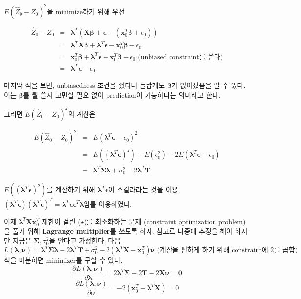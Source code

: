 \documentclass[b5paper,]{scrbook}
\theoremstyle{plain}
\theoremstyle{definition}
\numberwithin{equation}{section}
\begin{document}
\(E(\hat{Z}_{0}-Z_{0})^{2}\)을 minimize하기 위해 우선

\begin{eqnarray*}
\hat{Z}_{0}-Z_{0} &=& \boldsymbol{\lambda}^{T}(\mathbf{X}\boldsymbol{\beta}+\boldsymbol{\epsilon}-(\mathbf{x}_{0}^{T}\boldsymbol{\beta}+\epsilon_{0}))\\
&=&\boldsymbol{\lambda}^{T}\mathbf{X}\boldsymbol{\beta}+\boldsymbol{\lambda}^{T}\boldsymbol{\epsilon}-\mathbf{x}_{0}^{T}\boldsymbol{\beta}-\epsilon_{0}\\
&=&\mathbf{x}_{0}^{T}\boldsymbol{\beta}+\boldsymbol{\lambda}^{T}\boldsymbol{\epsilon}-\mathbf{x}_{0}^{T}\boldsymbol{\beta}-\epsilon_{0}\text{ (unbiased constraint를 쓴다)}\\
&=&\boldsymbol{\lambda}^{T}\boldsymbol{\epsilon}-\epsilon_{0}
\end{eqnarray*}

마지막 식을 보면, unbiasedness 조건을 줬더니 놀랍게도 \(\boldsymbol{\beta}\)가 없어졌음을 알 수 있다. 이는 \(\boldsymbol{\beta}\)를 뭘 쓸지 고민할 필요 없이 prediction이 가능하다는 의미라고 한다.

그러면 \(E(\hat{Z}_{0}-Z_{0})^{2}\)의 계산은

\begin{eqnarray*}
E(\hat{Z}_{0}-Z_{0})^{2}&=&E(\boldsymbol{\lambda}^{T}\boldsymbol{\epsilon}-\epsilon_{0})^{2}\\
&=&E((\boldsymbol{\lambda}^{T}\boldsymbol{\epsilon})^{2})+E(\epsilon_{0}^{2})-2E(\boldsymbol{\lambda}^{T}\boldsymbol{\epsilon}-\epsilon_{0})\\
&=&\boldsymbol{\lambda}^{T}\boldsymbol{\Sigma}\boldsymbol{\lambda}+\sigma_{0}^{2}-2\boldsymbol{\lambda}^{T}\mathbf{T}
\end{eqnarray*}

\(E((\boldsymbol{\lambda}^{T}\boldsymbol{\epsilon})^{2})\)를 계산하기 위해 \(\boldsymbol{\lambda}^{T}\boldsymbol{\epsilon}\)이 스칼라라는 것을 이용, \((\boldsymbol{\lambda}^{T}\boldsymbol{\epsilon})(\boldsymbol{\lambda}^{T}\boldsymbol{\epsilon})^{T}=\boldsymbol{\lambda}^{T}\boldsymbol{\epsilon}\boldsymbol{\epsilon}^{T}\boldsymbol{\lambda}\)임를 이용하였다.

이제 \(\boldsymbol{\lambda}^{T}\mathbf{X}\mathbf{x}_{0}^{T}\) 제한이 걸린 (\(\star\))를 최소화하는 문제 (constraint optimization problem)을 풀기 위해 \textbf{Lagrange multiplier}를 쓰도록 하자. 참고로 나중에 추정을 해야 하지만 지금은 \(\boldsymbol{\Sigma}, \sigma_{0}^{2}\)을 안다고 가정한다. 다음
\[
L(\boldsymbol{\lambda},\boldsymbol{\nu})=\boldsymbol{\lambda}^{T}\boldsymbol{\Sigma}\boldsymbol{\lambda}-2\boldsymbol{\lambda}^{T}\mathbf{T}+\sigma_{0}^{2}-2(\boldsymbol{\lambda}^{T}\mathbf{X}-\mathbf{x}_{0}^{T})\boldsymbol{\nu} \text{ (계산을 편하게 하기 위해 constraint에 2를 곱합)}
\]
식을 미분하면 minimizer를 구할 수 있다.
\[\frac{\partial L(\boldsymbol{\lambda},\boldsymbol{\nu})}{\partial \boldsymbol{\lambda}}=2\boldsymbol{\lambda}^{T}\boldsymbol{\Sigma}-2\mathbf{T}-2\mathbf{X}\boldsymbol{\nu}=\mathbf{0}\]
\[\frac{\partial L(\boldsymbol{\lambda},\boldsymbol{\nu})}{\partial \boldsymbol{\nu}}=-2(\mathbf{x}_{0}^{T}-\boldsymbol{\lambda}^{T}\mathbf{X})=0 \]
\end{document}
